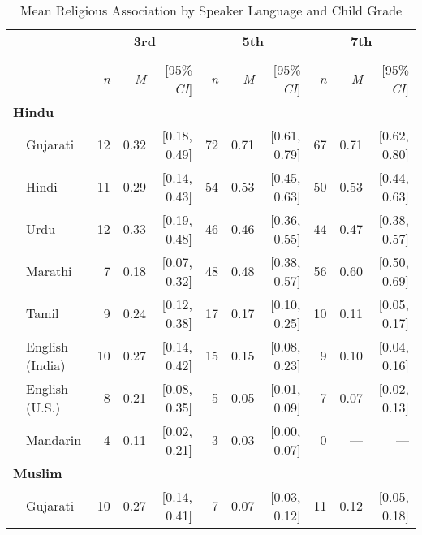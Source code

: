 \thispagestyle{empty}
\begin{table}[H]
\vspace{-20pt}
\centering
\caption{Mean Religious Association by Speaker Language and Child Grade}\label{tab:religion-means}\\
\begin{footnotesize}
\begin{tabular}{p{.1in}lrrrrrrrrr}
\toprule
 &  & \multicolumn{3}{c}{\textbf{3rd}} & \multicolumn{3}{c}{\textbf{5th}} & \multicolumn{3}{c}{\textbf{7th}} \\
\cline{3-5} \cline{6-8} \cline{9-11}\\[-.75em]
&  & \textit{n} & \textit{M} & [95\% \textit{CI}] &  \textit{n} & \textit{M} & [95\% \textit{CI}] &  \textit{n}  & \textit{M} & [95\% \textit{CI}]\\
\midrule
\multicolumn{11}{l}{\textbf{Hindu}}\\
 & Gujarati & 12 & 0.32 & [0.18, 0.49] & 72 & 0.71 & [0.61, 0.79] & 67 & 0.71 & [0.62, 0.80]\\

 & Hindi & 11 & 0.29 & [0.14, 0.43] & 54 & 0.53 & [0.45, 0.63] & 50 & 0.53 & [0.44, 0.63]\\

 & Urdu & 12 & 0.33 & [0.19, 0.48] & 46 & 0.46 & [0.36, 0.55] & 44 & 0.47 & [0.38, 0.57]\\

 & Marathi & 7 & 0.18 & [0.07, 0.32] & 48 & 0.48 & [0.38, 0.57] & 56 & 0.60 & [0.50, 0.69]\\

 & Tamil & 9 & 0.24 & [0.12, 0.38] & 17 & 0.17 & [0.10, 0.25] & 10 & 0.11 & [0.05, 0.17]\\

 & English (India) & 10 & 0.27 & [0.14, 0.42] & 15 & 0.15 & [0.08, 0.23] & 9 & 0.10 & [0.04, 0.16]\\

 & English (U.S.) & 8 & 0.21 & [0.08, 0.35] & 5 & 0.05 & [0.01, 0.09] & 7 & 0.07 & [0.02, 0.13]\\

& Mandarin & 4 & 0.11 & [0.02, 0.21] & 3 & 0.03 & [0.00, 0.07] & 0 & --- & ---\\

\midrule
\multicolumn{11}{l}{\textbf{Muslim}}\\
 & Gujarati & 10 & 0.27 & [0.14, 0.41] & 7 & 0.07 & [0.03, 0.12] & 11 & 0.12 & [0.05, 0.18]\\


\end{tabular}
\end{footnotesize}
\end{table}
